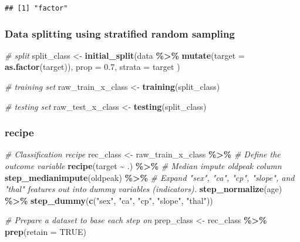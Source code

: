 \documentclass[
]{book}
\newenvironment{Shaded}{\begin{snugshade}}{\end{snugshade}}
\newcommand{\CommentTok}[1]{\textcolor[rgb]{0.56,0.35,0.01}{\textit{#1}}}
\newcommand{\DataTypeTok}[1]{\textcolor[rgb]{0.13,0.29,0.53}{#1}}
\newcommand{\FloatTok}[1]{\textcolor[rgb]{0.00,0.00,0.81}{#1}}
\newcommand{\KeywordTok}[1]{\textcolor[rgb]{0.13,0.29,0.53}{\textbf{#1}}}
\newcommand{\NormalTok}[1]{#1}
\newcommand{\OperatorTok}[1]{\textcolor[rgb]{0.81,0.36,0.00}{\textbf{#1}}}
\newcommand{\OtherTok}[1]{\textcolor[rgb]{0.56,0.35,0.01}{#1}}
\newcommand{\StringTok}[1]{\textcolor[rgb]{0.31,0.60,0.02}{#1}}
\begin{document}
\begin{verbatim}
## [1] "factor"
\end{verbatim}

\hypertarget{data-splitting-using-stratified-random-sampling}{%
\subsubsection{Data splitting using stratified random sampling}\label{data-splitting-using-stratified-random-sampling}}

\begin{Shaded}
\begin{Highlighting}[]
\CommentTok{\# split}
\NormalTok{split\_class \textless{}{-}}\StringTok{ }\KeywordTok{initial\_split}\NormalTok{(data }\OperatorTok{\%\textgreater{}\%}
\StringTok{  }\KeywordTok{mutate}\NormalTok{(}\DataTypeTok{target =} \KeywordTok{as.factor}\NormalTok{(target)),}
\DataTypeTok{prop =} \FloatTok{0.7}\NormalTok{,}
\DataTypeTok{strata =}\NormalTok{ target}
\NormalTok{)}

\CommentTok{\# training set}
\NormalTok{raw\_train\_x\_class \textless{}{-}}\StringTok{ }\KeywordTok{training}\NormalTok{(split\_class)}

\CommentTok{\# testing set}
\NormalTok{raw\_test\_x\_class \textless{}{-}}\StringTok{ }\KeywordTok{testing}\NormalTok{(split\_class)}
\end{Highlighting}
\end{Shaded}

\hypertarget{recipe-1}{%
\subsubsection{recipe}\label{recipe-1}}

\begin{Shaded}
\begin{Highlighting}[]
\CommentTok{\# Classification recipe}
\NormalTok{rec\_class \textless{}{-}}\StringTok{ }\NormalTok{raw\_train\_x\_class }\OperatorTok{\%\textgreater{}\%}
\StringTok{  }\CommentTok{\# Define the outcome variable}
\StringTok{  }\KeywordTok{recipe}\NormalTok{(target }\OperatorTok{\textasciitilde{}}\StringTok{ }\NormalTok{.) }\OperatorTok{\%\textgreater{}\%}
\StringTok{  }\CommentTok{\# Median impute oldpeak column}
\StringTok{  }\KeywordTok{step\_medianimpute}\NormalTok{(oldpeak) }\OperatorTok{\%\textgreater{}\%}
\StringTok{  }\CommentTok{\# Expand "sex", "ca", "cp", "slope", and "thal" features out into dummy variables (indicators).}
\StringTok{  }\KeywordTok{step\_normalize}\NormalTok{(age) }\OperatorTok{\%\textgreater{}\%}
\StringTok{  }\KeywordTok{step\_dummy}\NormalTok{(}\KeywordTok{c}\NormalTok{(}\StringTok{"sex"}\NormalTok{, }\StringTok{"ca"}\NormalTok{, }\StringTok{"cp"}\NormalTok{, }\StringTok{"slope"}\NormalTok{, }\StringTok{"thal"}\NormalTok{))}

\CommentTok{\# Prepare a dataset to base each step on}
\NormalTok{prep\_class \textless{}{-}}\StringTok{ }\NormalTok{rec\_class }\OperatorTok{\%\textgreater{}\%}\StringTok{ }\KeywordTok{prep}\NormalTok{(}\DataTypeTok{retain =} \OtherTok{TRUE}\NormalTok{)}
\end{Highlighting}
\end{Shaded}
\end{document}
